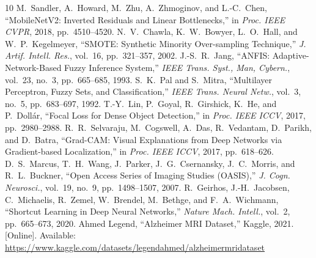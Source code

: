 \documentclass[journal]{IEEEtran}
\begin{document}
\begin{thebibliography}{10}
\small
{} M.~Sandler, A.~Howard, M.~Zhu, A.~Zhmoginov, and L.-C.~Chen,
``MobileNetV2: Inverted Residuals and Linear Bottlenecks,'' in \emph{Proc. IEEE
CVPR}, 2018, pp.~4510--4520.
 N.~V.~Chawla, K.~W.~Bowyer, L.~O.~Hall, and W.~P.~Kegelmeyer,
``SMOTE: Synthetic Minority Over-sampling Technique,'' \emph{J. Artif. Intell.
Res.}, vol.~16, pp.~321--357, 2002.
 J.-S.~R.~Jang, ``ANFIS: Adaptive-Network-Based Fuzzy Inference
System,'' \emph{IEEE Trans. Syst., Man, Cybern.}, vol.~23, no.~3, pp.~665--685,
1993.
S.~K.~Pal and S.~Mitra,
``Multilayer Perceptron, Fuzzy Sets, and Classification,''
\emph{IEEE Trans. Neural Netw.},
vol.~3, no.~5,
pp.~683--697,
1992.
 T.-Y.~Lin, P.~Goyal, R.~Girshick, K.~He, and P.~Doll\'ar, ``Focal
Loss for Dense Object Detection,'' in \emph{Proc. IEEE ICCV}, 2017,
pp.~2980--2988.
 R.~R.~Selvaraju, M.~Cogswell, A.~Das, R.~Vedantam, D.~Parikh,
and D.~Batra, ``Grad-CAM: Visual Explanations from Deep Networks via
Gradient-based Localization,'' in \emph{Proc. IEEE ICCV}, 2017, pp.~618--626.
 D.~S.~Marcus, T.~H.~Wang, J.~Parker, J.~G.~Csernansky,
J.~C.~Morris, and R.~L.~Buckner, ``Open Access Series of Imaging Studies
(OASIS),'' \emph{J. Cogn. Neurosci.}, vol.~19, no.~9, pp.~1498--1507, 2007.
 R.~Geirhos, J.-H.~Jacobsen, C.~Michaelis, R.~Zemel,
W.~Brendel, M.~Bethge, and F.~A.~Wichmann, ``Shortcut Learning in Deep Neural
Networks,'' \emph{Nature Mach. Intell.}, vol.~2, pp.~665--673, 2020.
 Ahmed Legend,
``Alzheimer MRI Dataset,''
Kaggle, 2021.
[Online]. Available:
\url{https://www.kaggle.com/datasets/legendahmed/alzheimermridataset}
\end{thebibliography}
\end{document}
